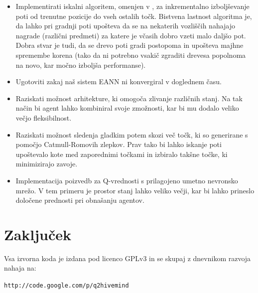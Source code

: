 \documentclass[a4paper,10pt]{article}
\begin{document}
\begin{itemize}
  \item Implementirati iskalni algoritem, omenjen v \cite{champandard02}, za inkrementalno izboljševanje poti od trenutne pozicije do vseh ostalih točk. Bistvena lastnost algoritma je, da lahko pri gradnji poti upošteva da se na nekaterih vozliščih nahajajo nagrade (različni predmeti) za katere je včasih dobro vzeti malo daljšo pot. Dobra stvar je tudi, da se drevo poti gradi postopoma in upošteva majhne spremembe korena (tako da ni potrebno vsakič zgraditi drevesa popolnoma na novo, kar močno izboljša performanse).
  
  \item Ugotoviti zakaj naš sistem EANN ni konvergiral v doglednem času.
  
  \item Raziskati možnost arhitekture, ki omogoča zlivanje različnih stanj. Na tak način bi agent lahko kombiniral svoje zmožnosti, kar bi mu dodalo veliko večjo fleksibilnost.
  
  \item Raziskati možnost sledenja gladkim potem skozi več točk, ki so generirane s pomočjo Catmull-Romovih zlepkov. Prav tako bi lahko iskanje poti upoštevalo kote med zaporednimi točkami in izbiralo takšne točke, ki minimizirajo zavoje.

  \item Implementacija poizvedb za Q-vrednosti s prilagojeno umetno nevronsko mrežo. V tem primeru je prostor stanj lahko veliko večji, kar bi lahko prineslo določene prednosti pri obnašanju agentov.
\end{itemize}

\section{Zaključek}

Vsa izvorna koda je izdana pod licenco GPLv3 in se skupaj z dnevnikom razvoja nahaja na:

\begin{center}
\texttt{http://code.google.com/p/q2hivemind}
\end{center}
\end{document}
